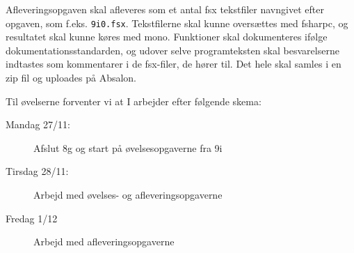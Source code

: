 \documentclass[a4paper,12pt]{article}
\begin{document}
Afleveringsopgaven skal afleveres som et antal fsx tekstfiler navngivet efter opgaven, som f.eks. \lstinline!9i0.fsx!. Tekstfilerne skal kunne oversættes med fsharpc, og resultatet skal kunne køres med mono. Funktioner skal dokumenteres ifølge dokumentationsstandarden, og udover selve programteksten skal besvarelserne indtastes som kommentarer i de fsx-filer, de hører til. Det hele skal samles i en zip fil og uploades på Absalon.

Til øvelserne forventer vi at I arbejder efter følgende skema:
\begin{description}
\item[Mandag 27/11:] Afslut 8g og start på øvelsesopgaverne fra 9i
\item[Tirsdag 28/11:] Arbejd med øvelses- og afleveringsopgaverne
\item[Fredag 1/12]  Arbejd med afleveringsopgaverne
\end{description}
\end{document}
